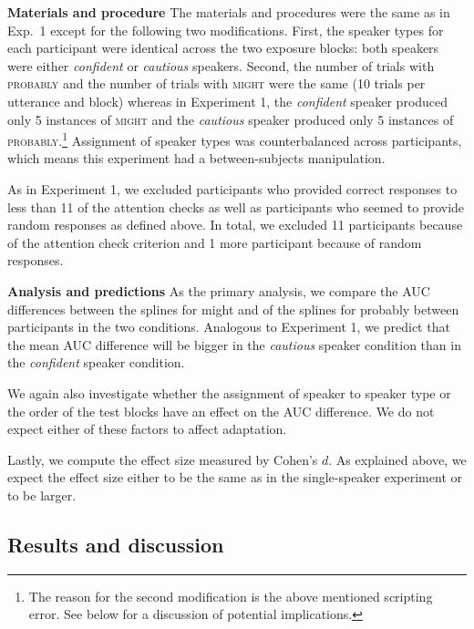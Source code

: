 \noindent \textbf{Materials and procedure} The materials and procedures were the same as in Exp.~1 except for the following two modifications.
First, the speaker types for each participant were identical across the two exposure blocks: both speakers were either \textit{confident} or \textit{cautious} speakers.
Second, the number of trials with \textsc{probably} and the number of trials with \textsc{might} were the same (10 trials per utterance and block) whereas in Experiment 1, the \textit{confident} speaker
 produced only 5 instances of \textsc{might} and the \textit{cautious} speaker produced  only 5 instances of \textsc{probably}.\footnote{The reason for the second modification is the above mentioned scripting error. See below for a discussion of potential implications.} Assignment of speaker types was counterbalanced across participants, which means this experiment had a between-subjects manipulation.

  
As in Experiment 1, we excluded participants who provided correct responses to less than 11 of the attention checks as well as participants who seemed to provide random responses as defined above. In total, we excluded 11 participants because of the attention check criterion and 1 more participant because of random responses. 


\noindent \textbf{Analysis and predictions} 
As the primary analysis, we compare the AUC differences between the splines for 
{\sc might} and of the splines for {\sc probably} between participants in the two conditions.
Analogous to Experiment 1, we predict that the mean AUC difference
will be bigger in the \emph{cautious} speaker condition than in the \emph{confident} speaker condition.

We again also investigate whether the assignment of speaker to speaker type or the order 
of the test blocks have an effect on the AUC difference. We do not expect either of these factors
to affect adaptation.

Lastly, we compute the effect size measured by Cohen's $d$. As explained above, we expect
the effect size either to be the same as in the single-speaker experiment or to be larger. 


\subsection{Results and discussion}

